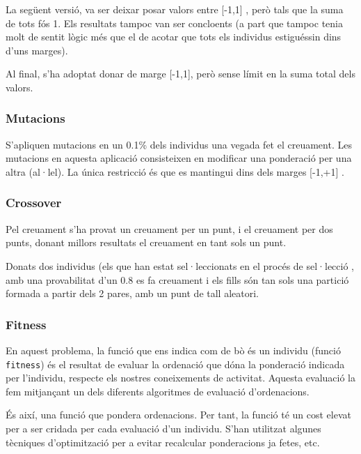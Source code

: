 \documentclass[titlepage,a4paper,12pt]{book}
\begin{document}
La següent versió, va ser deixar posar valors entre [-1,1] , però tals que la
suma de tots fós 1.  Els resultats tampoc van ser concloents (a part que tampoc
tenia molt de sentit lògic més que el de acotar que tots els individus
estiguéssin dins d'uns marges).

Al final, s'ha adoptat donar de marge [-1,1], però sense límit en la suma total
dels valors.


\subsubsection{Mutacions} %
\label{ssub:Mutacions}

S'apliquen mutacions en un 0.1\% dels individus una vegada fet el creuament.
Les mutacions en aquesta aplicació consisteixen en modificar una ponderació per
una altra (al·lel).  La única restricció és que es mantingui dins dels marges
[-1,+1] .

\subsubsection{Crossover} %
\label{ssub:Crossover}
Pel creuament s'ha provat un creuament per un punt, i el creuament per dos punts, donant millors
resultats el creuament en tant sols un punt.  

Donats dos individus (els que han estat sel·leccionats en el procés de
sel·lecció , amb una provabilitat d'un 0.8 es fa creuament i els fills són tan
sols una partició formada a partir dels 2 pares, amb un punt de tall aleatori.

\subsubsection{Fitness} %
\label{ssub:Fitness}
En aquest problema, la funció que ens indica com de bò és un individu (funció
\texttt{fitness}) és el resultat de evaluar la ordenació que dóna la ponderació
indicada per l'individu, respecte els nostres coneixements de activitat. Aquesta
evaluació la fem mitjançant un dels diferents algoritmes de evaluació d'ordenacions.



És així, una funció que pondera ordenacions.  Per tant, la funció té un cost
elevat per a ser cridada per cada evaluació d'un individu.  S'han utilitzat
algunes tècniques d'optimització per a evitar recalcular ponderacions ja fetes,
etc.
\end{document}
